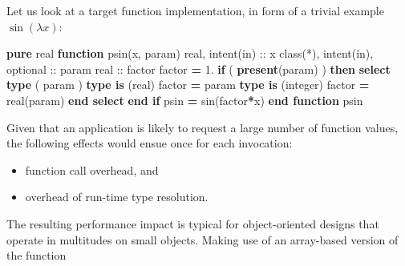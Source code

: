 \documentclass[
  paper=a4,
  ,captions=tableheading
]{scrartcl}
\newenvironment{Shaded}{\begin{snugshade}}{\end{snugshade}}
\newcommand{\BuiltInTok}[1]{#1}
\newcommand{\DataTypeTok}[1]{\textcolor[rgb]{0.13,0.29,0.53}{#1}}
\newcommand{\FloatTok}[1]{\textcolor[rgb]{0.00,0.00,0.81}{#1}}
\newcommand{\FunctionTok}[1]{\textcolor[rgb]{0.13,0.29,0.53}{\textbf{#1}}}
\newcommand{\KeywordTok}[1]{\textcolor[rgb]{0.13,0.29,0.53}{\textbf{#1}}}
\newcommand{\NormalTok}[1]{#1}
\providecommand{\tightlist}{%
  \setlength{\itemsep}{0pt}\setlength{\parskip}{0pt}}
\begin{document}
Let us look at a target function implementation, in form of a trivial
example \(\sin(\lambda x)\):

\begin{Shaded}
\begin{Highlighting}[]
\KeywordTok{pure} \DataTypeTok{real} \KeywordTok{function}\NormalTok{ psin(x, param)}
  \DataTypeTok{real}\NormalTok{, }\DataTypeTok{intent(in)} \DataTypeTok{::}\NormalTok{ x}
  \DataTypeTok{class(*)}\NormalTok{, }\DataTypeTok{intent(in)}\NormalTok{, }\DataTypeTok{optional} \DataTypeTok{::}\NormalTok{ param}
  \DataTypeTok{real} \DataTypeTok{::}\NormalTok{ factor}
\NormalTok{  factor }\KeywordTok{=} \FloatTok{1.}
  \KeywordTok{if}\NormalTok{ ( }\FunctionTok{present}\NormalTok{(param) ) }\KeywordTok{then}
    \KeywordTok{select type}\NormalTok{ ( param )}
     \KeywordTok{type is}\NormalTok{ (}\DataTypeTok{real}\NormalTok{)}
\NormalTok{      factor }\KeywordTok{=}\NormalTok{ param}
     \KeywordTok{type is}\NormalTok{ (}\DataTypeTok{integer}\NormalTok{)}
\NormalTok{      factor }\KeywordTok{=} \DataTypeTok{real(param)}
    \KeywordTok{end select}
  \KeywordTok{end if}
\NormalTok{  psin }\KeywordTok{=} \BuiltInTok{sin}\NormalTok{(factor}\KeywordTok{*}\NormalTok{x)}
\KeywordTok{end function}\NormalTok{ psin}
\end{Highlighting}
\end{Shaded}

Given that an application is likely to request a large number of
function values, the following effects would ensue once for each
invocation:

\begin{itemize}
\tightlist
\item
  function call overhead, and
\item
  overhead of run-time type resolution.
\end{itemize}

The resulting performance impact is typical for object-oriented designs
that operate in multitudes on small objects. Making use of an
array-based version of the function
\end{document}
